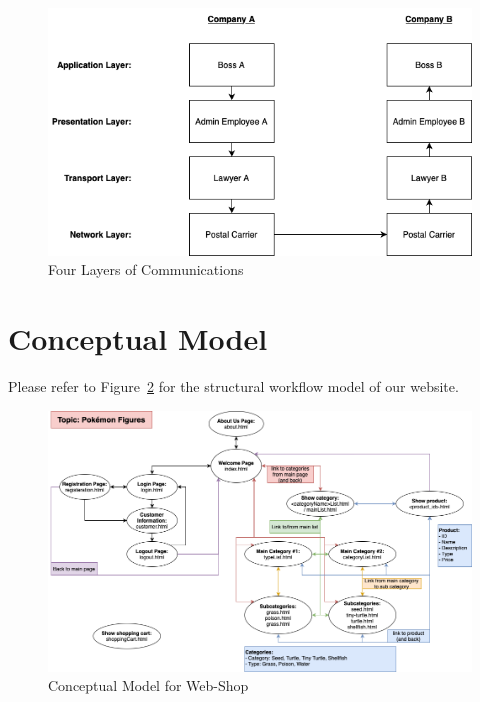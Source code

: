 \documentclass[a4paper,12pt]{article} %
\begin{document}
\begin{figure}[h]
    \centering
    \includegraphics[width=.8\textwidth]{communication-layers.drawio.png} %
    \caption{Four Layers of Communications}
    \label{fig:task1-3}
\end{figure}





\section{Conceptual Model}
Please refer to  Figure~\ref{fig:task2} for the structural workflow model of our website.

\begin{figure}[h]
    \centering
    \includegraphics[width=\textwidth]{conceptual-model.drawio.png} %
    \caption{Conceptual Model for Web-Shop}
    \label{fig:task2}
\end{figure}
\end{document}
